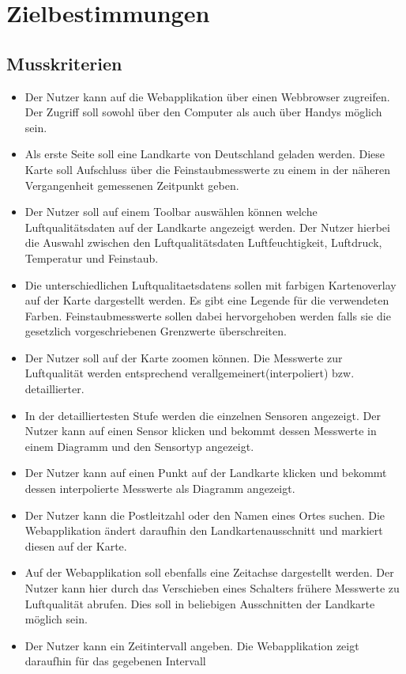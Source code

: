 \section{Zielbestimmungen}
\subsection{Musskriterien}
 \begin{itemize}
	\item Der Nutzer kann auf die Webapplikation über einen Webbrowser zugreifen. 
	Der Zugriff soll sowohl über den Computer als auch über Handys möglich sein.
	\item Als erste Seite soll eine Landkarte von Deutschland geladen werden.
	Diese Karte soll Aufschluss über die Feinstaubmesswerte zu einem in der näheren Vergangenheit gemessenen Zeitpunkt geben.
	\item Der Nutzer soll auf einem Toolbar auswählen können welche Luftqualitätsdaten auf der Landkarte angezeigt werden. 
	Der Nutzer hierbei die Auswahl zwischen den Luftqualitätsdaten Luftfeuchtigkeit, Luftdruck, Temperatur und Feinstaub.
	\item Die unterschiedlichen \glspl{Luftqualitaetsdaten} sollen mit farbigen Kartenoverlay auf der Karte dargestellt werden. 
	Es gibt eine Legende für die verwendeten Farben.
	Feinstaubmesswerte sollen dabei hervorgehoben werden falls sie die gesetzlich vorgeschriebenen Grenzwerte überschreiten.
	\item Der Nutzer soll auf der Karte zoomen können. 
	Die Messwerte zur Luftqualität werden entsprechend verallgemeinert(interpoliert) bzw. detaillierter.
	\item In der detailliertesten Stufe werden die einzelnen Sensoren angezeigt. 
	Der Nutzer kann auf einen Sensor klicken und bekommt dessen Messwerte in einem Diagramm und den Sensortyp angezeigt.
	\item Der Nutzer kann auf einen Punkt auf der Landkarte klicken und bekommt dessen interpolierte Messwerte als Diagramm angezeigt.
	\item Der Nutzer kann die Postleitzahl oder den Namen eines Ortes suchen. Die Webapplikation ändert daraufhin den Landkartenausschnitt und markiert diesen auf der Karte.
	\item Auf der Webapplikation soll ebenfalls eine Zeitachse dargestellt werden. 
	Der Nutzer kann hier durch das Verschieben eines Schalters frühere Messwerte zu Luftqualität abrufen. 
	Dies soll in beliebigen Ausschnitten der Landkarte möglich sein.
	\item Der Nutzer kann ein Zeitintervall angeben. Die Webapplikation zeigt daraufhin für das gegebenen Intervall 

\end{itemize}
